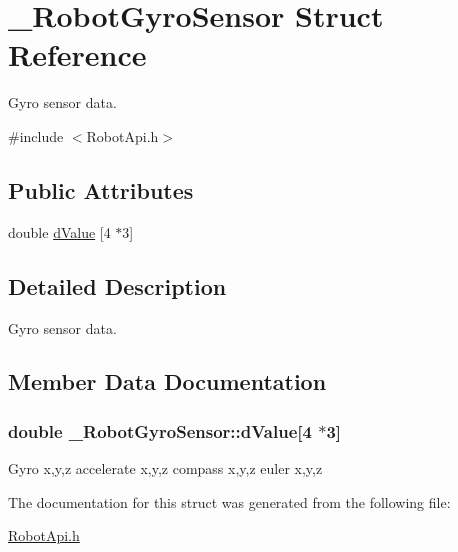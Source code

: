 \hypertarget{struct__RobotGyroSensor}{\section{\+\_\+\+Robot\+Gyro\+Sensor Struct Reference}
\label{struct__RobotGyroSensor}
}


Gyro sensor data.  




{\ttfamily \#include $<$Robot\+Api.\+h$>$}

\subsection*{Public Attributes}
\begin{DoxyCompactItemize}
\item 
double \hyperlink{struct__RobotGyroSensor_a0dbe9c8f5dd0cd4b931565d1db0e0f6e}{d\+Value} \mbox{[}4 $\ast$3\mbox{]}
\end{DoxyCompactItemize}


\subsection{Detailed Description}
Gyro sensor data. 

\subsection{Member Data Documentation}
\hypertarget{struct__RobotGyroSensor_a0dbe9c8f5dd0cd4b931565d1db0e0f6e}{
\subsubsection[{d\+Value}]{\setlength{\rightskip}{0pt plus 5cm}double \+\_\+\+Robot\+Gyro\+Sensor\+::d\+Value\mbox{[}4 $\ast$3\mbox{]}}}\label{struct__RobotGyroSensor_a0dbe9c8f5dd0cd4b931565d1db0e0f6e}
Gyro x,y,z accelerate x,y,z compass x,y,z euler x,y,z 

The documentation for this struct was generated from the following file\+:\begin{DoxyCompactItemize}
\item 
\hyperlink{RobotApi_8h}{Robot\+Api.\+h}\end{DoxyCompactItemize}
